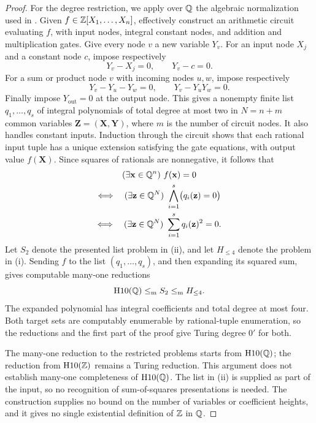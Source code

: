 \begin{proof}
For the degree restriction, we apply over \(\mathbb Q\) the algebraic
normalization used in \cite[Theorem~7.5]{Davis1973}. Given
\(f\in\mathbb Z[X_1,\ldots,X_n]\), effectively construct an arithmetic circuit
evaluating \(f\), with input nodes, integral constant nodes, and addition
and multiplication gates. Give every node \(v\) a new variable \(Y_v\).
For an input node \(X_j\) and a constant node \(c\), impose respectively
\[
                         Y_v-X_j=0,\qquad Y_v-c=0.
\]
For a sum or product node \(v\) with incoming nodes \(u,w\), impose
respectively
\[
                    Y_v-Y_u-Y_w=0,\qquad Y_v-Y_uY_w=0.
\]
Finally impose \(Y_{\mathrm{out}}=0\) at the output node. This gives a
nonempty finite list \(q_1,\ldots,q_s\) of integral polynomials of total
degree at most two in \(N=n+m\) common variables
\(\mathbf Z=(\mathbf X,\mathbf Y)\), where \(m\) is the number of circuit
nodes. It also handles constant inputs. Induction through the circuit shows
that each rational input tuple has a unique extension satisfying the
gate equations, with output value \(f(\mathbf X)\). Since squares of
rationals are nonnegative, it follows that
\[
\begin{gathered}
 (\exists\mathbf x\in\mathbb Q^n)\ f(\mathbf x)=0
 \\
 \Longleftrightarrow\quad
 (\exists\mathbf z\in\mathbb Q^N)\ \bigwedge_{i=1}^s \bigl(q_i(\mathbf z)=0\bigr)\\
 \Longleftrightarrow\quad
 (\exists\mathbf z\in\mathbb Q^N)\ \sum_{i=1}^s q_i(\mathbf z)^2=0.
\end{gathered}
\]
Let \(S_2\) denote the presented list problem in (ii), and let
\(H_{\le4}\) denote the problem in (i). Sending \(f\) to the list
\((q_1,\ldots,q_s)\), and then expanding its squared sum, gives computable
many-one reductions
\[
                    \mathrm{H10}(\mathbb Q)\le_{\mathrm m}S_2
                                      \le_{\mathrm m}H_{\le4}.
\]
The expanded polynomial has integral coefficients and total degree at
most four. Both target sets are computably enumerable by rational-tuple
enumeration, so the reductions and the first part of the proof give
Turing degree \(0'\) for both.

The many-one reduction to the restricted problems starts from
\(\mathrm{H10}(\mathbb Q)\); the reduction from \(\mathrm{H10}(\mathbb Z)\) remains a
Turing reduction. This argument does not establish many-one completeness
of \(\mathrm{H10}(\mathbb Q)\). The list in (ii) is supplied as part
of the input, so no recognition of sum-of-squares presentations is
needed. The construction supplies no bound on the number of variables
or coefficient heights, and it gives no single existential definition
of \(\mathbb Z\) in \(\mathbb Q\).
\end{proof}
